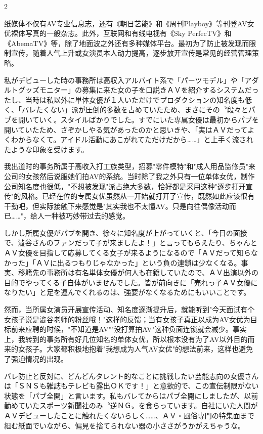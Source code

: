 \documentclass[12pt,UTF8]{ctexbook}
\begin{document}
\begin{paracol}{2}
\switchcolumn

纸媒体不仅有AV专业信息志，还有《朝日艺能》和《周刊Playboy》等刊登AV女优裸体写真的一般杂志。此外，互联网和有线电视有《Sky PerfecTV》和《AbemaTV》等，除了地面波之外还有多种媒体平台。最初为了防止被发现而限制宣传，随着人气上升或女演员本人动力提高，逐步放开宣传是常见的经营管理策略。

\switchcolumn*

私がデビューした時の事務所は高収入アルバイト系で「パーツモデル」や「アダルトグッズモニター」の募集に来た女の子を口説きＡＶを紹介するシステムだったし、当時は私以外に単体女優が１人いただけでプロダクションの知名度も低く、「バレたくない」派が圧倒的多数を占めていたため、まさにその〝段々とパブを開いていく〟スタイルばかりでした。すでにいた専属女優は最初からパブを開いていたため、さぞかしやる気があったのかと思いきや、「実はＡＶだってよくわからなくて。アイドル活動にあこがれてただけだから……」と上手く流されたような印象を受けます。

\switchcolumn

我出道时的事务所属于高收入打工族类型，招募"零件模特"和"成人用品监修员"来公司的女孩然后说服她们拍AV的系统。当时除了我之外只有一位单体女优，制作公司知名度也很低，"不想被发现"派占绝大多数，恰好都是采用这种"逐步打开宣传"的风格。已经在位的专属女优虽然从一开始就打开了宣传，既然如此应该很有干劲吧，但实际接触下来感觉是"其实我也不太懂AV。只是向往偶像活动而已……"，给人一种被巧妙带过去的感觉。

\switchcolumn*

しかし所属女優がパブを開き、徐々に知名度が上がっていくと、「今日の面接で、澁谷さんのファンだって子が来ましたよ！」と言ってもらえたり、ちゃんとＡＶ女優を目指して応募してくる女子が来るようになるので「ＡＶだって知らなかった」「ＡＶに出るつもりじゃなかった」という負の連鎖は少なくなる。事実、移籍先の事務所は有名単体女優が何人も在籍していたので、ＡＶ出演以外の目的でやってくる子自体がいませんでした。皆が前向きに「売れっ子ＡＶ女優になりたい」と足を運んでくれるのは、強要がなくなるためにもいいことです。

\switchcolumn

然而，当所属女演员开展宣传活动、知名度逐渐提升后，就能听到"今天面试有个女孩子说是澁谷老师的粉丝哦！"这样的反馈；当有女孩子真正以成为AV女优为目标前来应聘的时候，"不知道是AV""没打算拍AV"这种负面连锁就会减少。事实上，我转到的事务所有好几位知名的单体女优，所以根本没有为了AV以外目的而来的女孩子。大家都积极地抱着"我想成为人气AV女优"的想法前来，这样也避免了强迫情况的出现。

\switchcolumn*

バレ防止と反対に、どんどんタレント的なことに挑戦したい芸能志向の女優さんは「ＳＮＳも雑誌もテレビも露出ＯＫです！」と意欲的で、この宣伝制限がない状態を「パブ全開」と言います。私もバレてからはパブ全開にしましたが、以前勤めていたスポーツ新聞社のみ〝逆ＮＧ〟を食らっています。自社にいた人間がＡＶデビューしたことに触れたくないらしく……、ＡＶ・風俗専門の特集面まで組む紙面でいながら、偏見を捨てられない器の小ささがうかがえちゃうな。


\end{paracol}
\end{document}

